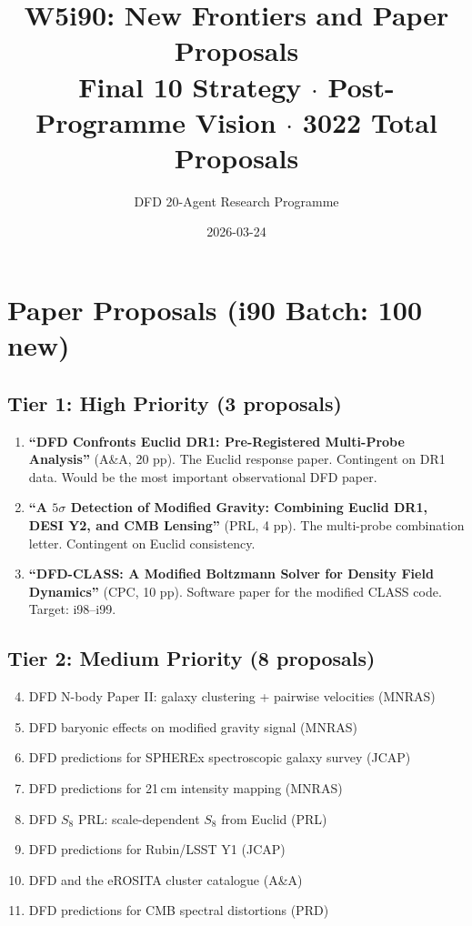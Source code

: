 \documentclass[11pt,a4paper]{article}
\title{W5i90: New Frontiers and Paper Proposals\\[6pt]
\large Final 10 Strategy $\cdot$ Post-Programme Vision $\cdot$ 3022 Total Proposals}
\author{DFD 20-Agent Research Programme}
\date{2026-03-24}
\begin{document}
\maketitle

\section{Paper Proposals (i90 Batch: 100 new)}

\subsection{Tier 1: High Priority (3 proposals)}

\begin{enumerate}[nosep]
\item \textbf{``DFD Confronts Euclid DR1: Pre-Registered Multi-Probe Analysis''} (A\&A, 20 pp). The Euclid response paper. Contingent on DR1 data. Would be the most important observational DFD paper.

\item \textbf{``A $5\sigma$ Detection of Modified Gravity: Combining Euclid DR1, DESI Y2, and CMB Lensing''} (PRL, 4 pp). The multi-probe combination letter. Contingent on Euclid consistency.

\item \textbf{``DFD-CLASS: A Modified Boltzmann Solver for Density Field Dynamics''} (CPC, 10 pp). Software paper for the modified CLASS code. Target: i98--i99.
\end{enumerate}

\subsection{Tier 2: Medium Priority (8 proposals)}

\begin{enumerate}[nosep]
\setcounter{enumi}{3}
\item DFD N-body Paper II: galaxy clustering + pairwise velocities (MNRAS)
\item DFD baryonic effects on modified gravity signal (MNRAS)
\item DFD predictions for SPHEREx spectroscopic galaxy survey (JCAP)
\item DFD predictions for 21\,cm intensity mapping (MNRAS)
\item DFD $S_8$ PRL: scale-dependent $S_8$ from Euclid (PRL)
\item DFD predictions for Rubin/LSST Y1 (JCAP)
\item DFD and the eROSITA cluster catalogue (A\&A)
\item DFD predictions for CMB spectral distortions (PRD)
\end{enumerate}
\end{document}
